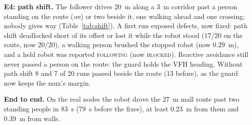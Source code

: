 \begin{table}[t]
  \centering
  \caption{E4: completed runs, their time and stops; smallest clearance, largest offset}
  \label{tab:shift}
  \footnotesize
  \setlength{\tabcolsep}{2.5pt}
  
\end{table}

\textbf{E4: path shift.} The follower drives 20~m along a 3~m corridor past a person standing on
the route (\emph{on}) or two beside it, one walking ahead and one crossing; nobody gives way
(Table~\ref{tab:shift}). A first run exposed defects, now fixed: path shift deadlocked short of
its offset or lost it while the robot stood (17/20 on the route, now 20/20), a walking person
brushed the stopped robot (now 0.29~m), and a held robot was reported \textsc{following} (now
\textsc{blocked}). Reactive avoidance still never passed a person on the route: the guard holds
the VFH heading. Without path shift 8 and 7 of 20 runs passed beside the route (13 before), as
the guard now keeps the mux's margin.

\textbf{End to end.} On the real nodes the robot drove the 27~m mall route past two standing
people in 83~s (79~s before the fixes), at least 0.23~m from them and 0.39~m from walls.
